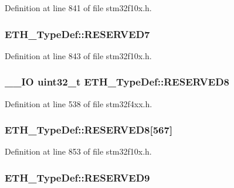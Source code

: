 Definition at line 841 of file stm32f10x.\-h.

\hypertarget{struct_e_t_h___type_def_a47e35fda6c33b0fda10a0b3faeb635d9}{
\subsubsection[{R\-E\-S\-E\-R\-V\-E\-D7}]{ E\-T\-H\-\_\-\-Type\-Def\-::\-R\-E\-S\-E\-R\-V\-E\-D7}}\label{struct_e_t_h___type_def_a47e35fda6c33b0fda10a0b3faeb635d9}


Definition at line 843 of file stm32f10x.\-h.

\hypertarget{struct_e_t_h___type_def_a4b086ebc9087098ce0909c37d9f784b9}{
\subsubsection[{R\-E\-S\-E\-R\-V\-E\-D8}]{\setlength{\rightskip}{0pt plus 5cm}\-\_\-\-\_\-\-I\-O {\bf uint32\-\_\-t} E\-T\-H\-\_\-\-Type\-Def\-::\-R\-E\-S\-E\-R\-V\-E\-D8}}\label{struct_e_t_h___type_def_a4b086ebc9087098ce0909c37d9f784b9}


Definition at line 538 of file stm32f4xx.\-h.

\hypertarget{struct_e_t_h___type_def_a912e8bfafc581d114dc646952209aa1c}{
\subsubsection[{R\-E\-S\-E\-R\-V\-E\-D8}]{ E\-T\-H\-\_\-\-Type\-Def\-::\-R\-E\-S\-E\-R\-V\-E\-D8\mbox{[}567\mbox{]}}}\label{struct_e_t_h___type_def_a912e8bfafc581d114dc646952209aa1c}


Definition at line 853 of file stm32f10x.\-h.

\hypertarget{struct_e_t_h___type_def_a2a3572dff49da3dbf983ab8498c5f959}{
\subsubsection[{R\-E\-S\-E\-R\-V\-E\-D9}]{ E\-T\-H\-\_\-\-Type\-Def\-::\-R\-E\-S\-E\-R\-V\-E\-D9}}\label{struct_e_t_h___type_def_a2a3572dff49da3dbf983ab8498c5f959}


